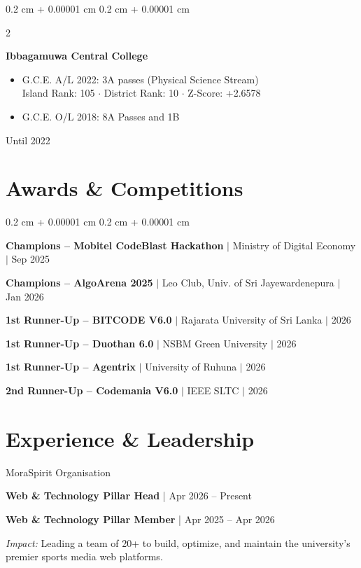 \documentclass[10pt, letterpaper]{article}
\newenvironment{highlights}{
    \begin{itemize}[
        topsep=0.08 cm,
        parsep=0pt,
        partopsep=0pt,
        itemsep=0.10 cm,
        leftmargin=0.4 cm + 10pt
    ]
}{
    \end{itemize}
}
\newenvironment{onecolentry}{
    \begin{adjustwidth}{
        0.2 cm + 0.00001 cm
    }{
        0.2 cm + 0.00001 cm
    }
}{
    \end{adjustwidth}
    \vspace{0.12cm}
}
\newenvironment{twocolentry}[2][]{
	\onecolentry
	\def\secondColumn{#2}
	\setcolumnwidth{\fill, 4.5 cm}
	\begin{paracol}{2}
	}{
		\switchcolumn \raggedleft \secondColumn
	\end{paracol}
	\endonecolentry
} %
\newcommand{\award}[3]{%
    \textbf{#1} \textcolor{lightblack}{$|$ #2 $|$ #3}\par\vspace{0.08cm}%
}
\newcommand{\role}[2]{\textbf{#1} \textcolor{lightblack}{| #2}}
\begin{document}
    \vspace{0.25 cm}

    \begin{twocolentry}{
        Until 2022
    }
        \textbf{Ibbagamuwa Central College}
        \begin{highlights}
            \item G.C.E. A/L 2022: 3A passes (Physical Science Stream)\\[0.15cm]
            \hspace*{1.5em}Island Rank: 105 $\cdot$ District Rank: 10 $\cdot$ Z-Score: +2.6578
            \item G.C.E. O/L 2018: 8A Passes and 1B
        \end{highlights}
    \end{twocolentry}

    \section{Awards \& Competitions}
    \begin{onecolentry}
        \award{Champions -- Mobitel CodeBlast Hackathon}{Ministry of Digital Economy}{Sep 2025}
        \award{Champions -- AlgoArena 2025}{Leo Club, Univ. of Sri Jayewardenepura}{Jan 2026}
        \award{1st Runner-Up -- BITCODE V6.0}{Rajarata University of Sri Lanka}{2026}
        \award{1st Runner-Up -- Duothan 6.0}{NSBM Green University}{2026}
        \award{1st Runner-Up -- Agentrix}{University of Ruhuna}{2026}
        \award{2nd Runner-Up -- Codemania V6.0}{IEEE SLTC}{2026}
    \end{onecolentry}

    \section{Experience \& Leadership}
    \begin{experience}{MoraSpirit Organisation}
        \item \role{Web \& Technology Pillar Head}{Apr 2026 -- Present}
        \item \role{Web \& Technology Pillar Member}{Apr 2025 -- Apr 2026}
        \item \textit{Impact:} Leading a team of 20+ to build, optimize, and maintain the university's premier sports media web platforms.
    \end{experience}

    \vspace{0.15cm}
\end{document}
